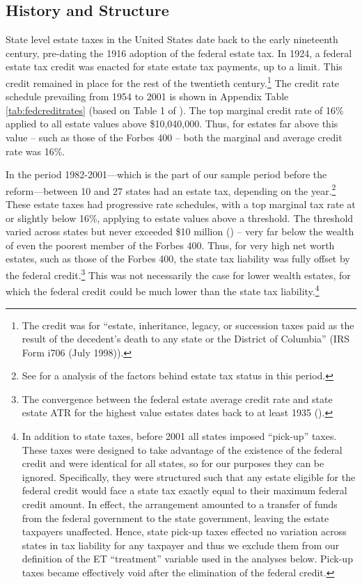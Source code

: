 \documentclass[12pt]{article}
\begin{document}
\subsection{History and Structure}
State level estate taxes in the United States date back to the early nineteenth century, pre-dating the 1916 adoption of the federal estate tax. In 1924, a federal estate tax credit was enacted for state estate tax payments, up to a limit. This credit remained in place for the rest of the twentieth century.\footnote{The credit was for ``estate, inheritance, legacy, or succession taxes paid as the result of the decedent's death to any state or the District of Columbia'' (IRS Form i706 (July 1998)).}  The credit rate schedule prevailing from 1954 to 2001 is shown in Appendix Table \ref{tab:fedcreditrates} (based on Table 1 of \cite{bakija/slemrod:2004}). The top marginal credit rate of 16\% applied to all estate values above \$10,040,000. Thus, for estates far above this value -- such as those of the Forbes 400  -- both the marginal and average credit rate was 16\%.


In the period 1982-2001---which is the part of our sample period before the reform---between 10 and 27 states had an estate tax, depending on the year.\footnote{See \cite{conway2004diagnosis} for a analysis of the factors behind estate tax status in this period.} These estate taxes had progressive rate schedules, with a top marginal tax rate at or slightly below 16\%, applying to estate values above a threshold. The threshold varied across states but never exceeded \$10 million (\cite{bakija/slemrod:2004}) -- very far below the wealth of even the poorest member of the Forbes 400. Thus, for very high net worth estates, such as those of the Forbes 400, the state tax liability was fully offset by the federal credit.\footnote{The convergence between the federal estate average credit rate and state estate ATR for the highest value estates dates back to at least 1935 (\cite{cooper2006interstate}).} This was not necessarily the case for lower wealth estates, for which   
the federal credit  could be much lower than  the state tax liability.\footnote{In addition to state taxes, before 2001  all states imposed ``pick-up'' taxes. These taxes were designed to 
take advantage of the existence of the federal credit and were identical for all states, so for our purposes they can be ignored.  
Specifically, they were structured such that any estate eligible for the federal credit would face a state tax exactly equal to their maximum federal credit amount. In effect, the arrangement amounted to a transfer of funds from the federal government to the state government, leaving the estate taxpayers unaffected. Hence, state pick-up taxes effected no variation across states in tax liability for any taxpayer and thus we exclude them from our definition of the ET ``treatment'' variable used in the analyses below. Pick-up taxes became effectively void after the elimination of the federal credit.} 
\end{document}
